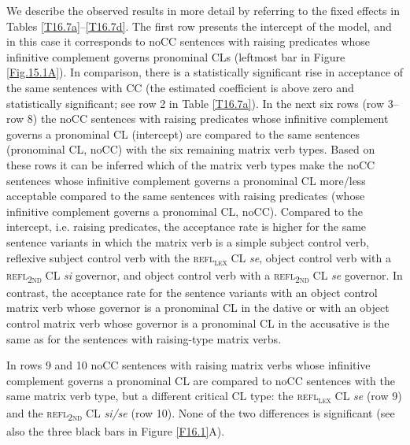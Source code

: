 We describe the observed results in more detail by referring to the fixed effects in Tables \ref{T16.7a}--\ref{T16.7d}. The first row presents the intercept of the model, and in this case it corresponds to noCC sentences with raising predicates whose infinitive complement governs pronominal CLs (leftmost bar in Figure \ref{Fig.15.1A}). In comparison, there is a statistically significant rise in acceptance of the same sentences with CC (the estimated coefficient is above zero and statistically significant; see row 2 in Table \ref{T16.7a}). In the next six rows (row 3–row 8) the noCC sentences with raising predicates whose infinitive complement governs a pronominal CL (intercept) are compared to the same sentences (pronominal CL, noCC) with the six remaining matrix verb types. Based on these rows it can be inferred which of the matrix verb types make the noCC sentences whose infinitive complement governs a pronominal CL more/less acceptable compared to the same sentences with raising predicates (whose infinitive complement governs a pronominal CL, noCC). Compared to the intercept, i.e. raising predicates, the acceptance rate is higher for the same sentence variants in which the matrix verb is a simple subject control verb, reflexive subject control verb with the \textsc{refl\textsubscript{\textsc{lex}}} CL \textit{se}, object control verb with a \textsc{refl\textsubscript{2nd}} CL \textit{si} governor, and object control verb with a \textsc{refl\textsubscript{2nd}} CL \textit{se} governor. In contrast, the acceptance rate for the sentence variants with an object control matrix verb whose governor is a pronominal CL in the dative or with an object control matrix verb whose governor is a pronominal CL in the accusative is the same as for the sentences with raising-type matrix verbs. 

In rows 9 and 10 noCC sentences with raising matrix verbs whose infinitive complement governs a pronominal CL are compared to noCC sentences with the same matrix verb type, but a different critical CL type: the \textsc{refl\textsubscript{\textsc{lex}}} CL \textit{se} (row 9) and the \textsc{refl\textsubscript{2nd}} CL \textit{si/se} (row 10). None of the two differences is significant (see also the three black bars in Figure \ref{F16.1}A). 


